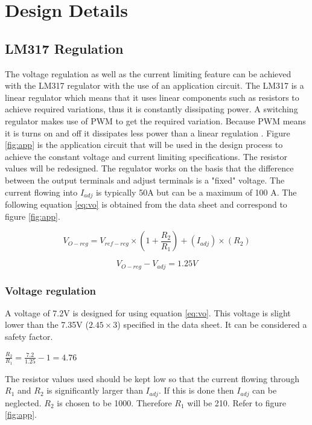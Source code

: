 \chapter{Design Details}\label{Lit:desDetails}

\section{LM317 Regulation}
\label{sec:regulation}
The voltage regulation as well as the current limiting feature can be achieved with the LM317 regulator with the use of an application circuit. The LM317 is a linear regulator which means that it uses linear components such as resistors to achieve required variations, thus it is constantly dissipating power. A switching regulator makes use of PWM  to get the required variation. Because PWM means it is turns on and off it dissipates less power than a linear regulation \cite{SvsL}. Figure \ref{fig:app} is the application circuit that will be used in the design process to achieve the constant voltage and current limiting specifications. The resistor values will be redesigned. The regulator works on the basis that the difference between the output terminals and adjust terminals is a "fixed" voltage. The current flowing into $I_{adj}$ is typically 50\textmu{}A but can be a maximum of 100 \textmu{}A\cite{STM}.
The following equation \ref{eq:vo} is obtained from the data sheet \cite{STM} and correspond to figure  \ref{fig:app}.

\begin{equation}
    V_{O-reg}=V_{ref-reg}\times(1+\frac{R_2}{R_1})+(I_{adj})\times (R_2)
    \label{eq:vo}
\end{equation}

    \begin{equation}
         V_{O-reg}-V_{adj}=1.25V
         \label{eq:vref}
    \end{equation}

\subsection{Voltage regulation}
A voltage of 7.2V is designed for using equation \ref{eq:vo}. This voltage is slight lower than the 7.35V  ($2.45\times3$) specified in the data sheet. It can be considered a safety factor.  
\begin{center}
    $\frac{R_2}{R_1}=\frac{7.2}{1.25}-1=4.76$
\end{center}

The resistor values used should be kept low so that the current flowing through $R_1$ and $R_{2}$ is significantly larger than $I_{adj}$. If this is done then $I_{adj}$ can be neglected. $R_{2}$ is chosen to be 1000\textohm. Therefore $R_{1}$ will be 210\textohm. Refer to figure \ref{fig:app}.


